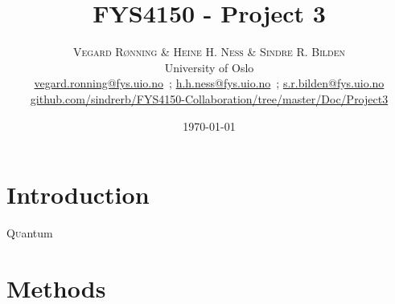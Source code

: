 \documentclass[twoside,twocolumn]{article}
\title{FYS4150 - Project 3} %
\author{%
	\textsc{Vegard R\o{}nning \& Heine H. Ness \& Sindre R. Bilden} \\[1ex] %
	\normalsize University of Oslo \\ %
	\normalsize \href{mailto:vegard.ronning@fys.uio.no}{vegard.ronning@fys.uio.no}\ ; \href{mailto:h.h.ness@fys.uio.no}{h.h.ness@fys.uio.no}\ ; \href{mailto:s.r.bilden@fys.uio.no}{s.r.bilden@fys.uio.no}\\%
	\footnotesize \href{https://github.com/sindrerb/FYS4150-Collaboration/tree/master/Doc/Project3}{github.com/sindrerb/FYS4150-Collaboration/tree/master/Doc/Project3}
}
\date{\today} %
\begin{document}
	
\maketitle

\section{Introduction}
\lettrine[nindent=0em,lines=2]{Q}uantum \blindtext
\section{Methods}
\label{sec:methods}
\blindtext
\blindtext
\newpage
\end{document}
